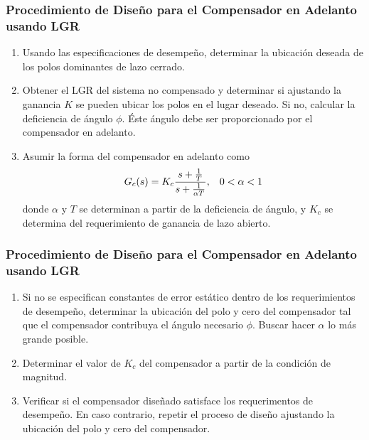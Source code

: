 \documentclass[aspectratio=169,handout]{beamer}
\theoremstyle{definition}
\theoremstyle{plain}
\theoremstyle{remark}
\newcounter{saveenumi}
\newcommand{\seti}{\setcounter{saveenumi}{\value{enumi}}}
\newcommand{\conti}{\setcounter{enumi}{\value{saveenumi}}}
\begin{document}
\begin{frame}[<+->]\frametitle{Procedimiento de Diseño para el Compensador en Adelanto usando LGR}
	\begin{enumerate}
		\item Usando las especificaciones de desempeño, determinar la ubicación deseada de los polos dominantes de lazo cerrado.
		\item Obtener el LGR del sistema no compensado y determinar si ajustando la ganancia $K$ se pueden ubicar los polos en el lugar deseado. Si no, calcular la deficiencia de ángulo $\phi$. Éste ángulo debe ser proporcionado por el compensador en adelanto.
		\item Asumir la forma del compensador en adelanto como
		\begin{equation*}
			G_c(s) = K_c \frac{s+\frac{1}{T}}{s+\frac{1}{\alpha T}}, \hspace*{3mm} 0 < \alpha < 1
		\end{equation*}
		donde $\alpha$ y $T$ se determinan a partir de la deficiencia de ángulo, y $K_c$ se determina del requerimiento de ganancia de lazo abierto.
		\seti
	\end{enumerate}
\end{frame}

\begin{frame}[<+->]\frametitle{Procedimiento de Diseño para el Compensador en Adelanto usando LGR}
	\begin{enumerate}
		\conti
		\item Si no se especifican constantes de error estático dentro de los requerimientos de desempeño, determinar la ubicación del polo y cero del compensador tal que el compensador contribuya el ángulo necesario $\phi$. Buscar hacer $\alpha$ lo más grande posible.
		\item Determinar el valor de $K_c$ del compensador a partir de la condición de magnitud.
		\item Verificar si el compensador diseñado satisface los requerimentos de desempeño. En caso contrario, repetir el proceso de diseño ajustando la ubicación del polo y cero del compensador.
	\end{enumerate}
\end{frame}
\end{document}
